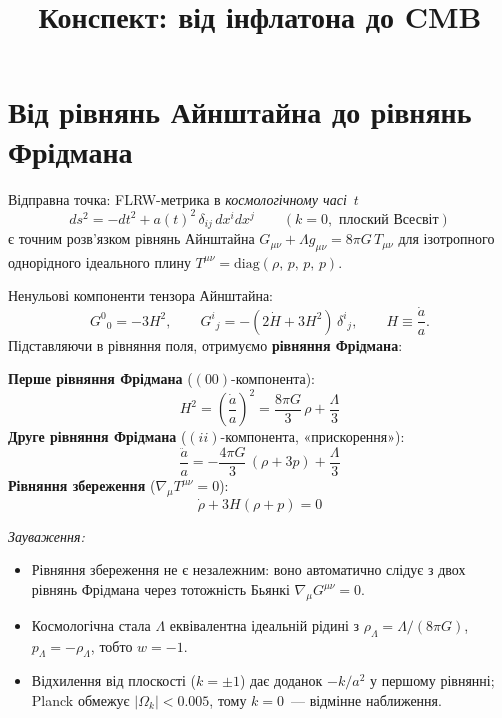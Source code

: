 \documentclass[12pt, a4paper]{article}
\title{\bfseries Конспект: від інфлатона до CMB}
\author{}
\date{}
\begin{document}
\maketitle
\tableofcontents
\newpage

\section{Від рівнянь Айнштайна до рівнянь Фрідмана}


Відправна точка: FLRW-метрика в \emph{космологічному часі}~$t$
\begin{equation}\label{eq:FLRW}
  ds^2 = -dt^2 + a(t)^2\,\delta_{ij}\,dx^i dx^j
  \qquad (k=0,\text{ плоский Всесвіт})
\end{equation}
є точним розв'язком рівнянь Айнштайна
$G_{\mu\nu} + \Lambda g_{\mu\nu} = 8\pi G\,T_{\mu\nu}$
для ізотропного однорідного ідеального плину
$T^{\mu\nu} = \mathrm{diag}(\rho,\,p,\,p,\,p)$.

Ненульові компоненти тензора Айнштайна:
\begin{equation*}
  G^0{}_0 = -3H^2,
  \qquad
  G^i{}_j = -(2\dot H + 3H^2)\,\delta^i{}_j,
  \qquad
  H \equiv \frac{\dot a}{a}.
\end{equation*}
Підставляючи в рівняння поля, отримуємо \textbf{рівняння Фрідмана}:

\begin{keybox}
\textbf{Перше рівняння Фрідмана} ($(00)$-компонента):
\begin{equation}\label{eq:F1}
  H^2 = \left(\frac{\dot a}{a}\right)^2 = \frac{8\pi G}{3}\,\rho + \frac{\Lambda}{3}
\end{equation}
\textbf{Друге рівняння Фрідмана} ($(ii)$-компонента, «прискорення»):
\begin{equation}\label{eq:F2}
  \frac{\ddot a}{a} = -\frac{4\pi G}{3}\,(\rho + 3p) + \frac{\Lambda}{3}
\end{equation}
\textbf{Рівняння збереження} ($\nabla_\mu T^{\mu\nu} = 0$):
\begin{equation}\label{eq:conservation_low}
  \dot\rho + 3H(\rho + p) = 0
\end{equation}
\end{keybox}

\noindent
\textit{Зауваження:}
\begin{itemize}
  \item Рівняння збереження не є незалежним: воно автоматично слідує
        з двох рівнянь Фрідмана через тотожність Бьянкі
        $\nabla_\mu G^{\mu\nu} = 0$.
  \item Космологічна стала $\Lambda$ еквівалентна ідеальній рідині
        з $\rho_\Lambda = \Lambda/(8\pi G)$, $p_\Lambda = -\rho_\Lambda$,
        тобто $w = -1$.
  \item Відхилення від плоскості ($k = \pm 1$) дає доданок
        $-k/a^2$ у першому рівнянні; Planck обмежує $|\Omega_k| < 0.005$,
        тому $k=0$~--- відмінне наближення.
\end{itemize}
\end{document}
